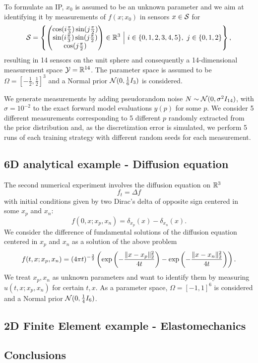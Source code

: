 To formulate an IP, $x_0$ is assumed to be an unknown parameter and we aim at identifying it by measurements of $f(x;x_0)$ in sensors $x \in \mathcal S$ for 
\[
    \mathcal S = \left\{
        \begin{pmatrix}
            \cos( i \frac{\pi}{3}) \sin( j \frac{\pi}{2}) \\
            \sin( i \frac{\pi}{3}) \sin( j \frac{\pi}{2}) \\ 
            \cos( j \frac{\pi}{2})
        \end{pmatrix} 
        \in \mathbb{R}^3 \ \Big| \ i \in \{0,1,2,3,4,5\}, \ j \in \{0,1,2\}
     \right\},
\]
resulting in 14 sensors on the unit sphere and consequently a 14-dimensional measurement space $\mathcal Y = \mathbb{R}^{14}$. \newline
The parameter space is assumed to be $\Omega = \left[-\frac{1}{2}, \frac{1}{2}\right]^3$ and a Normal prior $\mathcal N (0, \frac{1}{6}I_3)$ is considered. \medskip

We generate measurements by adding pseudorandom noise $N \sim \mathcal N (0, \sigma^2 I_{14})$, with $\sigma = 10^{-2}$ to the exact forward model evaluations $y(p)$ for some $p$. 
We consider 5 different measurements corresponding to 5 different $p$ randomly extracted from the prior distribution and, as the discretization error is simulated, we perform 5 runs of each training strategy with different random seeds for each measurement.
\medskip

\subsection{6D analytical example - Diffusion equation}\label{sec:6dexp}

The second numerical experiment involves the diffusion equation on $\mathbb{R}^3$
\[
f_t = \Delta f
\]
with initial conditions given by two Dirac's delta of opposite sign centered in some $x_p$ and $x_n$:
\[
f (0,x; x_p, x_n) = \delta_{x_p}(x) - \delta_{x_n}(x).
\]
We consider the difference of fundamental solutions of the diffusion equation centered in $x_p$ and $x_n$ as a solution of the above problem
\[
f(t,x; x_p, x_n) = (4 \pi t)^{-\frac{3}{2}} \left( \exp \left( - \frac{\lVert x-x_p\rVert_2^2}{4t}\right)- \exp \left( - \frac{\lVert x-x_n\rVert_2^2}{4t}\right) \right).
\]
We treat $x_p, x_n$ as unknown parameters and want to identify them by measuring $u(t,x;x_p, x_n)$ for certain $t,x$. As a parameter space, $\Omega = [-1,1]^6$ is considered and a Normal prior $\mathcal N (0, \frac{1}{4}I_6)$.

\subsection{2D Finite Element example - Elastomechanics}\label{sec:FEexp}



\subsection{Conclusions}\label{sec:concl}
